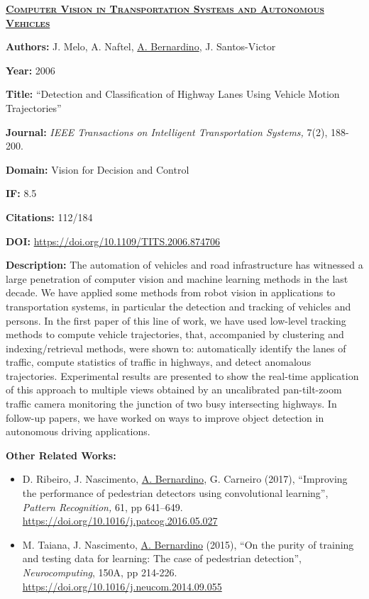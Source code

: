 \documentclass[
]{article}
\begin{document}
\textbf{\textsc{\ul{Computer Vision in Transportation Systems and
Autonomous Vehicles}}}

\textbf{Authors:} J. Melo, A. Naftel, \ul{A. Bernardino}, J.
Santos-Victor

\textbf{Year:} 2006

\textbf{Title:} ``Detection and Classification of Highway Lanes Using
Vehicle Motion Trajectories''

\textbf{Journal:} \emph{IEEE Transactions on Intelligent Transportation
Systems,} 7(2), 188-200.

\textbf{Domain:} Vision for Decision and Control

\textbf{IF:} 8.5

\textbf{Citations:} 112/184

\textbf{DOI:} \url{https://doi.org/10.1109/TITS.2006.874706}

\textbf{Description:} The automation of vehicles and road infrastructure
has witnessed a large penetration of computer vision and machine
learning methods in the last decade. We have applied some methods from
robot vision in applications to transportation systems, in particular
the detection and tracking of vehicles and persons. In the first paper
of this line of work, we have used low-level tracking methods to compute
vehicle trajectories, that, accompanied by clustering and
indexing/retrieval methods, were shown to: automatically identify the
lanes of traffic, compute statistics of traffic in highways, and detect
anomalous trajectories. Experimental results are presented to show the
real-time application of this approach to multiple views obtained by an
uncalibrated pan-tilt-zoom traffic camera monitoring the junction of two
busy intersecting highways. In follow-up papers, we have worked on ways
to improve object detection in autonomous driving applications.

\textbf{Other Related Works:}

\begin{itemize}
\item
  D. Ribeiro, J. Nascimento, \ul{A. Bernardino}, G. Carneiro (2017),
  ``Improving the performance of pedestrian detectors using
  convolutional learning'', \emph{Pattern Recognition,} 61, pp 641--649.
  \url{https://doi.org/10.1016/j.patcog.2016.05.027}
\item
  M. Taiana, J. Nascimento, \ul{A. Bernardino} (2015), ``On the purity
  of training and testing data for learning: The case of pedestrian
  detection'', \emph{Neurocomputing}, 150A, pp 214-226.
  \url{https://doi.org/10.1016/j.neucom.2014.09.055}
\end{itemize}
\end{document}
